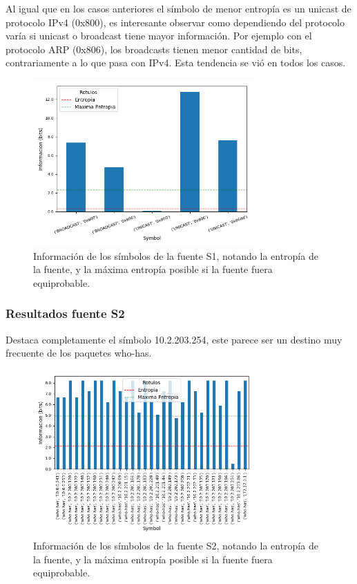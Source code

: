 Al igual que en los casos anteriores el símbolo de menor entropía es un unicast de protocolo IPv4 (0x800), es interesante observar como dependiendo del protocolo varía si unicast o broadcast tiene mayor información. Por ejemplo con el protocolo ARP (0x806), los broadcasts tienen menor cantidad de bits, contrariamente a lo que pasa con IPv4. Esta tendencia se vió en todos los casos.

\begin{figure}[H]
 \centering
 \includegraphics[width=8.5cm]{figs/information_labo6_2018_04_18_S1_output.png}
 \caption{\normalfont Información de los símbolos de la fuente S1, notando la entropía de la fuente, y la máxima entropía posible si la fuente fuera equiprobable.}
\end{figure}

\subsubsection*{Resultados fuente S2}

Destaca completamente el símbolo 10.2.203.254, este parece ser un destino muy frecuente de los paquetes who-has.

\begin{figure}[H]
 \centering
 \includegraphics[width=8.5cm]{figs/information_labo6_2018_04_18_S2_output.png}
 \caption{\normalfont Información de los símbolos de la fuente S2, notando la entropía de la fuente, y la máxima entropía posible si la fuente fuera equiprobable.}
\end{figure}

